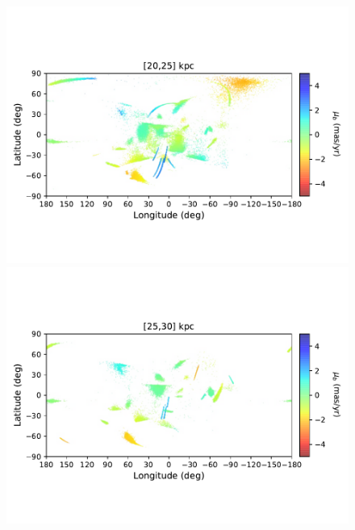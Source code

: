 \begin{figure}[h!]
\begin{center}
            \includegraphics[clip=true, trim = 0mm 20mm 0mm 20mm, width=0.9\columnwidth]{images/PII_ensemble_LB_D20-25_PMB_new.pdf}
            \includegraphics[clip=true, trim = 0mm 20mm 0mm 20mm, width=0.9\columnwidth]{images/PII_ensemble_LB_D25-30_PMB_new.pdf}


\end{center}
\end{figure}
